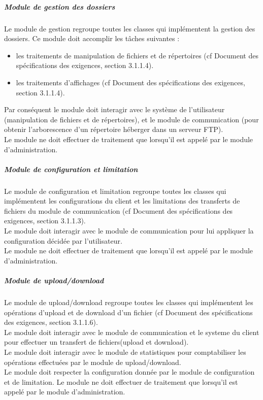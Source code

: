 \documentclass[10pt,a4paper]{report}
\begin{document}
	
				\subparagraph{Module de gestion des dossiers}
				\begin{flushleft}
				Le module de gestion regroupe toutes les classes qui implémentent la gestion des dossiers. Ce module doit accomplir les tâches suivantes :
				\begin{itemize}
					\item les traitements de manipulation de fichiers et de répertoires (cf Document des spécifications des exigences, section 3.1.1.4).
					\item les traitements d'affichages (cf Document des spécifications des exigences, section 3.1.1.4).
				\end{itemize}
				
				Par conséquent le module doit interagir avec le système de l'utilisateur (manipulation de fichiers et de répertoires), et le module de communication (pour obtenir l'arborescence d'un répertoire héberger dans un serveur FTP).\\
				Le module ne doit effectuer de traitement que lorsqu'il est appelé par le module d'administration.
				\end{flushleft}
	
				\subparagraph{Module de configuration et limitation}	
				\begin{flushleft}
				Le module de configuration et limitation regroupe toutes les classes qui implémentent les configurations du client et les limitations des transferts de fichiers du module de communication (cf Document des spécifications des exigences, section 3.1.1.3).\\
				Le module doit interagir avec le module de communication pour lui appliquer la configuration décidée par l'utilisateur.\\
				Le module ne doit effectuer de traitement que lorsqu'il est appelé par le module d'administration.
				\end{flushleft}
	
				\subparagraph{Module de upload/download}
				\begin{flushleft}
				Le module de upload/download regroupe toutes les classes qui implémentent les opérations d'upload et de download d'un fichier (cf Document des spécifications des exigences, section 3.1.1.6). \\
				Le module doit interagir avec le module de communication et le systeme du client pour effectuer un transfert de fichiers(upload et download).\\
				Le module doit interagir avec le module de statistiques pour comptabiliser les opérations effectuées par le module de upload/download.\\
				Le module doit respecter la configuration donnée par le module de configuration et de limitation.
				Le module ne doit effectuer de traitement que lorsqu'il est appelé par le module d'administration.
				\end{flushleft}
	
\end{document}
